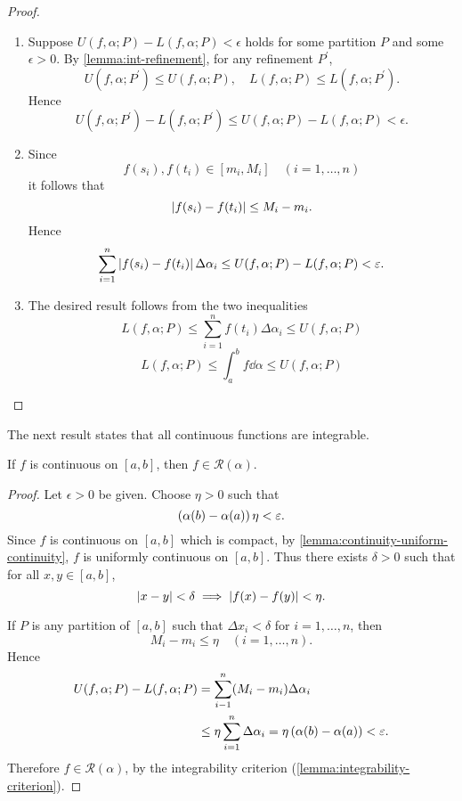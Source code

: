 \begin{proof} \
\begin{enumerate}[label=(\roman*)]
\item Suppose $U(f,\alpha;P)-L(f,\alpha;P)<\epsilon$ holds for some partition $P$ and some $\epsilon>0$. By \ref{lemma:int-refinement}, for any refinement $P^\prime$,
\[U(f,\alpha;P^\prime)\le U(f,\alpha;P),\quad L(f,\alpha;P)\le L(f,\alpha;P^\prime).\]
Hence
\[U(f,\alpha;P^\prime)-L(f,\alpha;P^\prime)\le U(f,\alpha;P)-L(f,\alpha;P)<\epsilon.\]

\item Since
\[f(s_i),f(t_i)\in[m_i,M_i]\quad(i=1,\dots,n)\]
it follows that
\[\left|f(s_i)-f(t_i)\right|\le M_i-m_i.\]
Hence
\[\sum_{i=1}^{n}\left|f(s_i)-f(t_i)\right|\Delta\alpha_i\le U(f,\alpha;P)-L(f,\alpha;P)<\varepsilon.\]

\item The desired result follows from the two inequalities
\[L(f,\alpha;P)\le\sum_{i=1}^{n}f(t_i)\Delta\alpha_i\le U(f,\alpha;P)\]
\[L(f,\alpha;P)\le\int_{a}^{b}f\dd{\alpha}\le U(f,\alpha;P)\]
\end{enumerate}
\end{proof}

The next result states that all continuous functions are integrable.

\begin{proposition}
If $f$ is continuous on $[a,b]$, then $f\in \mathcal{R}(\alpha)$.
\end{proposition}

\begin{proof}
Let $\epsilon>0$ be given. Choose $\eta>0$ such that
\[\left(\alpha(b)-\alpha(a)\right)\eta<\varepsilon.\]
Since $f$ is continuous on $[a,b]$ which is compact, by \ref{lemma:continuity-uniform-continuity}, $f$ is uniformly continuous on $[a,b]$. Thus there exists $\delta>0$ such that for all $x,y\in[a,b]$,
\[|x-y|<\delta\implies\left|f(x)-f(y)\right|<\eta.\]

If $P$ is any partition of $[a,b]$ such that $\Delta x_i<\delta$ for $i=1,\dots,n$, then
\[M_i-m_i\le\eta\quad(i=1,\dots,n).\]
Hence
\begin{align*}
U(f,\alpha;P)-L(f,\alpha;P)
&=\sum_{i-1}^{n}(M_i-m_i)\Delta\alpha_i\\
&\le\eta\sum_{i=1}^{n}\Delta\alpha_i=\eta\left(\alpha(b)-\alpha(a)\right)<\varepsilon.
\end{align*}
Therefore $f\in\mathcal{R}(\alpha)$, by the integrability criterion (\ref{lemma:integrability-criterion}).
\end{proof}

